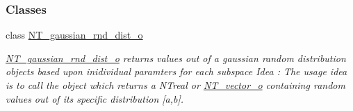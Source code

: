 \subsubsection*{Classes}
\begin{DoxyCompactItemize}
\item 
class \hyperlink{class_n_t__gaussian__rnd__dist__o}{NT\_\-gaussian\_\-rnd\_\-dist\_\-o}
\begin{DoxyCompactList}\small\item\em \hyperlink{class_n_t__gaussian__rnd__dist__o}{NT\_\-gaussian\_\-rnd\_\-dist\_\-o} returns values out of a gaussian random distribution objects based upon inidividual paramters for each subspace Idea : The usage idea is to call the object which returns a NTreal or \hyperlink{class_n_t__vector__o}{NT\_\-vector\_\-o} containing random values out of its specific distribution \mbox{[}a,b\mbox{]}. \item\end{DoxyCompactList}\end{DoxyCompactItemize}
